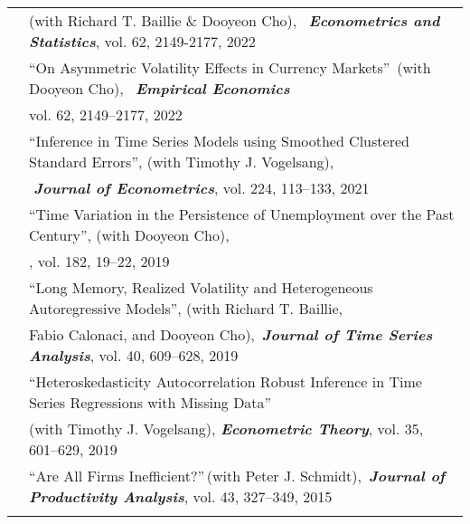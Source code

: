 \documentclass[10pt]{article}
\begin{document}
\begin{center}
\begin{tabular}{llllr}
& \multicolumn{4}{l}{(with Richard T. Baillie \& Dooyeon Cho), \,{\bf\emph{ Econometrics and Statistics}}, vol. 62, 2149-2177, 2022}\vspace{0.1cm}\\
& \multicolumn{4}{l}{\textquotedblleft On Asymmetric Volatility Effects in Currency Markets\textquotedblright \ (with Dooyeon Cho), \,{\bf\emph{ Empirical Economics}}}\\
& \multicolumn{4}{l}{ \quad vol. 62, 2149--2177, 2022}\vspace{0.1cm}\\
& \multicolumn{4}{l}{\textquotedblleft Inference in Time Series Models using Smoothed Clustered Standard Errors\textquotedblright, (with Timothy J. Vogelsang),}\\
 & \multicolumn{4}{l}{{\bf \emph{ \,\,Journal of Econometrics}}, vol. 224, 113--133, 2021} \vspace{0.1cm}\\
& \multicolumn{4}{l}{\textquotedblleft Time Variation in the Persistence of Unemployment over the Past Century\textquotedblright, (with Dooyeon Cho),}\\
 & \multicolumn{4}{l}{\hspace{0.2cm}{\bf\emph{Economics Letters}}, vol. 182, 19--22, 2019}  \vspace{0.1cm}\\
& \multicolumn{4}{l}{\textquotedblleft  Long Memory, Realized Volatility and Heterogeneous Autoregressive Models\textquotedblright, (with Richard T. Baillie,}\\
& \multicolumn{4}{l}{\hspace{0.2cm} Fabio Calonaci, and Dooyeon Cho),\, \emph{{\bf\emph{Journal of Time Series Analysis}}}, vol. 40, 609--628, 2019} \vspace{0.1cm}\\
 & \multicolumn{4}{l}{\textquotedblleft Heteroskedasticity Autocorrelation Robust Inference in Time Series Regressions with Missing Data\textquotedblright \ } \\
& \multicolumn{4}{l}{\hspace{0.2cm}(with Timothy J. Vogelsang), \emph{{\bf\emph {Econometric Theory}}}, vol. 35, 601--629, 2019}  \vspace{0.1cm}\\
& \multicolumn{4}{l}{\textquotedblleft Are All Firms Inefficient?\textquotedblright \,(with Peter J. Schmidt),\, {\bf\emph{Journal of Productivity Analysis}}, vol. 43, 327--349, 2015 } \\
\multicolumn{5}{p{460pt}}{}\\

\end{tabular}
\end{center}
\end{document}

